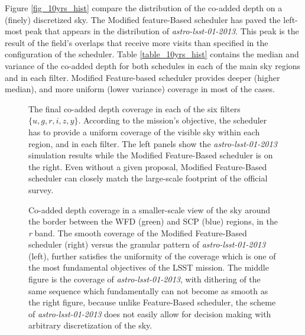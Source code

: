 \documentclass[12pt]{aastex62}
\theoremstyle{definition}
\begin{document}
Figure \ref{fig_10yrs_hist} compare the distribution of the co-added depth on a (finely) discretized sky. The Modified feature-Based scheduler has paved the left-most peak that appears in the distribution of \textit{astro-lsst-01-2013}. This peak is the result of the field's overlaps that receive more visits than specified in the configuration of the scheduler. Table \ref{table_10yrs_hist} contains the median and variance of the co-added depth for both schedules in each of the main sky regions and in each filter. Modified Feature-based scheduler provides deeper (higher median), and more uniform (lower variance) coverage in most of the cases.

\begin{figure}[h!]
\caption{The final co-added depth coverage in each of the six filters $\{ u, g, r, i, z, y\}$. According to the mission's objective, the scheduler has to provide a uniform coverage of the visible sky within each region, and in each filter. The left panels show the \textit{astro-lsst-01-2013} simulation results while the Modified Feature-Based scheduler is on the right. Even without a given proposal, Modified Feature-Based scheduler can closely match the large-scale footprint of the official survey.}
\label{fig_10yrs_skymap}
\end{figure}


\begin{figure}
\caption{Co-added depth coverage in a smaller-scale view of the sky around the border between the WFD (green) and SCP (blue) regions, in the \textit{r} band. The smooth coverage of the Modified Feature-Based scheduler (right) versus the granular pattern of \textit{astro-lsst-01-2013} (left), further satisfies the uniformity of the coverage which is one of the most fundamental objectives of the LSST mission. The middle figure is the coverage of \textit{astro-lsst-01-2013}, with dithering of the same sequence which fundamentally can not become as smooth as the right figure, because unlike Feature-Based scheduler, the scheme of \textit{astro-lsst-01-2013} does not easily allow for decision making with arbitrary discretization of the sky.}\label{fig_zoomin_r}
\end{figure}
\end{document}
